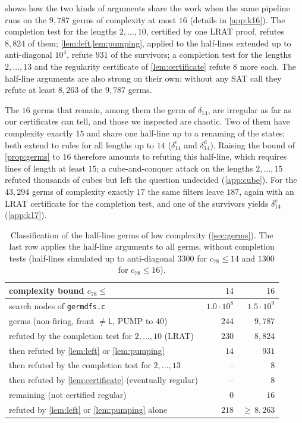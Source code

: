  shows how the two kinds of arguments share the work when
the same pipeline runs on the $9{,}787$ germs of complexity at most $16$
(details in \cref{app:k16}). The completion test for the lengths
$2,\dots,10$, certified by one LRAT proof, refutes $8{,}824$ of them;
\cref{lem:left,lem:pumping}, applied to the half-lines extended up to
anti-diagonal $10^4$, refute $931$ of the survivors; a completion test for
the lengths $2,\dots,13$ and the regularity certificate of
\cref{lem:certificate} refute $8$ more each. The half-line arguments are
also strong on their own: without any SAT call they refute at least
$8{,}263$ of the $9{,}787$ germs.

The $16$ germs that remain, among them the germ of $\delta_{14}$, are irregular
as far as our certificates can tell, and those we inspected are chaotic.
Two of them have complexity exactly $15$ and share one half-line up to a
renaming of the states; both extend to rules for all lengths up to $14$
($\delta_{14}^{\mathrm c}$ and $\delta_{14}^{\mathrm d}$). Raising the bound
of \cref{prop:germs} to $16$ therefore amounts to refuting this half-line,
which requires lines of length at least $15$; a cube-and-conquer attack on
the lengths $2,\dots,15$ refuted thousands of cubes but left the question
undecided (\cref{app:cube}). For the $43{,}294$ germs of complexity exactly
$17$ the same filters leave $187$, again with an LRAT certificate for the
completion test, and one of the survivors yields $\delta_{14}^{\mathrm e}$
(\cref{app:k17}).

\begin{table}[t]
\centering\small
\begin{tabular}{@{}lrr@{}}
\toprule
complexity bound $c_{78}\le$ & $14$ & $16$\\
\midrule
search nodes of \texttt{germdfs.c} & $1.0\cdot10^{8}$ & $1.5\cdot10^{9}$\\
germs (non-firing, front $\ne\mathsf L$, $\mathrm{PUMP}$ to $40$) & $244$ & $9{,}787$\\
refuted by the completion test for $2,\dots,10$ (LRAT) & $230$ & $8{,}824$\\
then refuted by \cref{lem:left} or \cref{lem:pumping} & $14$ & $931$\\
then refuted by the completion test for $2,\dots,13$ & -- & $8$\\
then refuted by \cref{lem:certificate} (eventually regular) & -- & $8$\\
remaining (not certified regular) & $0$ & $16$\\
\midrule
refuted by \cref{lem:left} or \cref{lem:pumping} alone & $218$ & ${\ge}\,8{,}263$\\
\bottomrule
\end{tabular}
\caption{Classification of the half-line germs of low complexity
(\cref{sec:germs}). The last row applies the half-line arguments to all
germs, without completion tests (half-lines simulated up to anti-diagonal
$3300$ for $c_{78}\le14$ and $1300$ for $c_{78}\le16$).}
\label{tab:germs}
\end{table}


